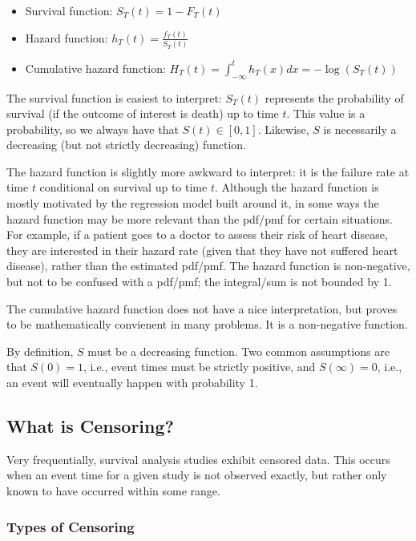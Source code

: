 \documentclass[a4paper]{article}
\begin{document}
  \begin{itemize}
  \item Survival function: $S_T(t) = 1 - F_T(t)$
  \item Hazard function: $h_T(t) = \frac{f_T(t)}{S_T(t)}$
  \item Cumulative hazard function: 
      $H_T(t) = \displaystyle \int_{-\infty}^{t} h_T(x) dx
      =
      -\log(S_T(t))$
  \end{itemize}

  The survival function is easiest to interpret: $S_T(t)$ represents the probability of survival (if the outcome of interest is death) up to time $t$. This value is a probability, so we always have that $S(t) \in [0,1]$. Likewise, $S$ is necessarily a decreasing (but not strictly decreasing) function. 
  
  The hazard function is slightly more awkward to interpret: it is the failure rate at time $t$ conditional on survival up to time $t$. Although the hazard function is mostly motivated by the regression model built around it, in some ways the hazard function may be more relevant than the pdf/pmf for certain situations. For example, if a patient goes to a doctor to assess their risk of heart disease, they are interested in their hazard rate (given that they have not suffered heart disease), rather than the estimated pdf/pmf. The hazard function is non-negative, but not to be confused with a pdf/pmf; the integral/sum is not bounded by 1. 
  
  The cumulative hazard function does not have a nice interpretation, but proves to be mathematically convienent in many problems. It is a non-negative function. 

  By definition, $S$ must be a decreasing function. Two common assumptions are that $S(0) = 1$, i.e., event times must be strictly positive, and $S(\infty) = 0$, i.e., an event will eventually happen with probability 1. 

\subsection{What is Censoring?}

  Very frequentially, survival analysis studies exhibit censored data. This occurs when an event time for a given study is not observed exactly, but rather only known to have occurred within some range. 
  
  \subsubsection{Types of Censoring}
\end{document}
